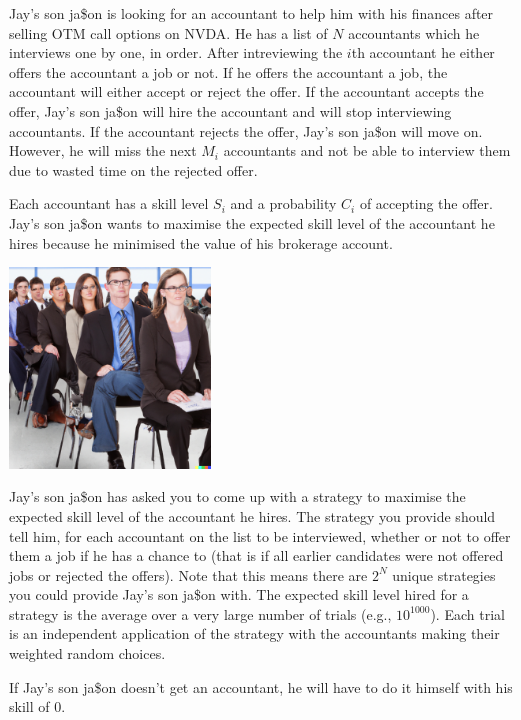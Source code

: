 
Jay's son ja\$on is looking for an accountant to help him with his finances
after selling OTM call options on NVDA. He has a list of $N$ accountants which
he interviews one by one, in order. After intreviewing the $i$th accountant he either
offers the accountant a job or not. If he offers the accountant a job, the
accountant will either accept or reject the offer. If the accountant accepts the
offer, Jay's son ja\$on will hire the accountant and will stop interviewing accountants. If the accountant rejects the
offer, Jay's son ja\$on will move on. However, he will miss the next $M_i$
accountants and not be able to interview them due to wasted time on the rejected
offer.

Each accountant has a skill level $S_i$ and a probability $C_i$ of accepting the
offer. Jay's son ja\$on wants to maximise the expected skill level
of the accountant he hires because he minimised the value of his brokerage
account.

\begin{center}
    \includegraphics[width=0.4\textwidth]{fig}
\end{center}

Jay's son ja\$on has asked you to come up with a strategy to maximise the expected skill
level of the accountant he hires. The strategy you provide should tell him, for each
accountant on the list to be interviewed, whether or not to offer them a job if he
has a chance to (that is if all earlier candidates were not offered jobs or rejected the offers).
Note that this means there are $2^N$ unique strategies you could provide Jay's son ja\$on with.
The expected skill level hired for a strategy is the average over a very large number of trials
(e.g., $10^{1000}$). Each trial is an independent application of the strategy with the accountants making
their weighted random choices.

If Jay's son ja\$on doesn't get an accountant, he
will have to do it himself with his skill of 0.


